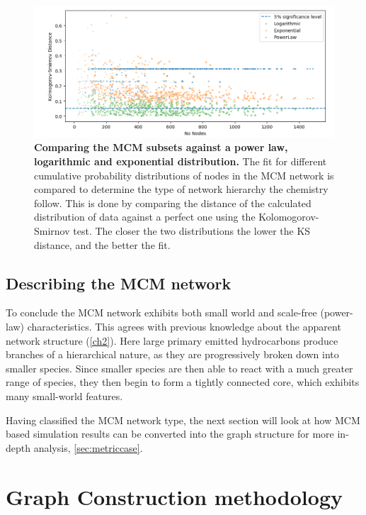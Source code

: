 \begin{figure}[H]
     \centering
         \includegraphics[width=\textwidth]{figures_c3/KSdistance.png}
        \caption{\textbf{Comparing the MCM subsets against a power law, logarithmic and exponential distribution.} The fit for different cumulative probability distributions of nodes in the MCM network is compared to determine the type of network hierarchy the chemistry follow. This is done by comparing the distance of the calculated distribution of data against a perfect one using the Kolomogorov-Smirnov test. The closer the two distributions the lower the KS distance, and the better the fit. }
        \label{fig:ksd}
\end{figure}

\subsection{Describing the MCM network}
To conclude the MCM network exhibits both small world and scale-free (power-law) characteristics. This agrees with previous knowledge about the apparent network structure (\autoref{ch2}). Here large primary emitted hydrocarbons produce branches of a hierarchical nature, as they are progressively broken down into smaller species. Since smaller species are then able to react with a much greater range of species, they then begin to form a tightly connected core, which exhibits many small-world features. 

Having classified the MCM network type, the next section will look at how MCM based simulation results can be converted into the graph structure for more in-depth analysis, \autoref{sec:metriccase}.


\section{Graph Construction methodology }\label{sec:chem}

